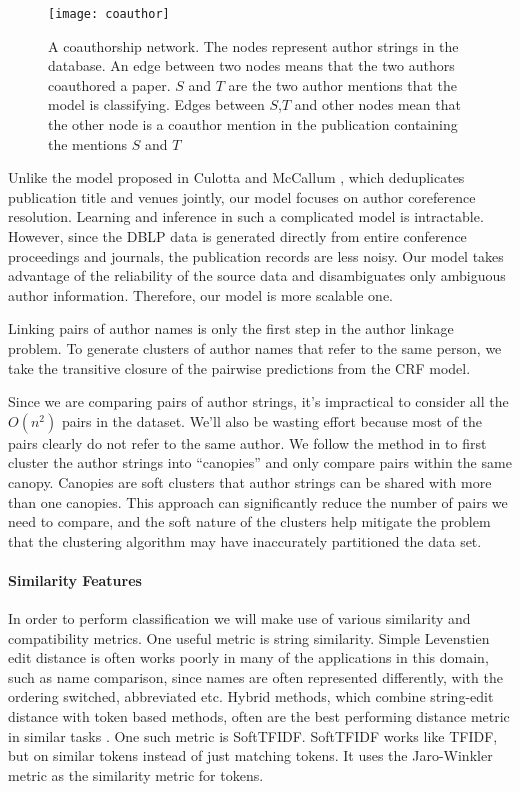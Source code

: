 \documentclass[twocolumn,letterpaper]{article}
\begin{document}
\begin{figure}
\centering
\texttt{[image: coauthor]}
\caption{A coauthorship network.  The nodes represent author strings
  in the database.  An edge between two nodes means that the two
  authors coauthored a paper.  $S$ and $T$ are the two author mentions
  that the model is classifying. Edges between $S$,$T$ and other nodes 
  mean that the other node is a coauthor mention in the publication containing
  the mentions $S$ and $T$}
\label{fig:coauthor}
\end{figure}

Unlike the model proposed in Culotta and McCallum
\cite{Culotta05aconditional}, which deduplicates publication title and
venues jointly, our model focuses on author coreference resolution.
Learning and inference in such a complicated model is intractable.
However, since the DBLP data is generated directly from entire
conference proceedings and journals, the publication records are less
noisy.  Our model takes advantage of the reliability of the source
data and disambiguates only ambiguous author information.  Therefore,
our model is more scalable one.

Linking pairs of author names is only the first step in the author
linkage problem.  To generate clusters of author names that refer to
the same person, we take the transitive closure of the pairwise
predictions from the CRF model.

Since we are comparing pairs of author strings, it's impractical to
consider all the $O(n^2)$ pairs in the dataset.  We'll also be wasting
effort because most of the pairs clearly do not refer to the same
author.  We follow the method in \cite{McCallum00} to first cluster
the author strings into ``canopies'' and only compare pairs within the
same canopy.  Canopies are soft clusters that author strings can be
shared with more than one canopies.  This approach can significantly
reduce the number of pairs we need to compare, and the soft nature of
the clusters help mitigate the problem that the clustering algorithm
may have inaccurately partitioned the data set.


\paragraph{Similarity Features} %
\label{par:similarity_features}
In order to perform classification we will make use of various similarity and compatibility metrics. One useful metric is string similarity. Simple Levenstien edit distance is often works poorly in many of the applications in this domain, such as name comparison, since names are often represented differently, with the ordering switched, abbreviated etc. Hybrid methods, which combine string-edit distance with token based methods, often are the best performing distance metric in similar tasks \cite{cohen2003comparison}. One such metric is SoftTFIDF. SoftTFIDF works like TFIDF, but on similar tokens instead of just matching tokens. It uses the Jaro-Winkler metric as the similarity metric for tokens. 
\end{document}
